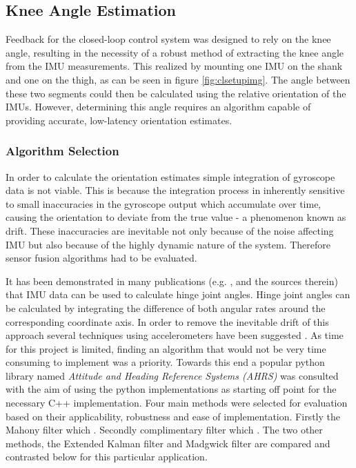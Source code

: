 \subsection{Knee Angle Estimation}
Feedback for the closed-loop control system was designed to rely on the knee angle, resulting in the necessity of a robust method of extracting the knee angle from the IMU measurements. This realized by mounting one IMU on the shank and one on the thigh, as can be seen in figure \ref{fig:clsetupimg}. The angle between these two segments could then be calculated using the relative orientation of the IMUs. However, determining this angle requires an algorithm capable of providing accurate, low-latency orientation estimates. 


\subsubsection{Algorithm Selection}
In order to calculate the orientation estimates simple integration of gyroscope data is not viable. This is because the integration process in inherently sensitive to small inaccuracies in the gyroscope output which accumulate over time, causing the orientation to deviate from the true value - a phenomenon known as drift. These inaccuracies are inevitable not only because of the noise affecting IMU but also because of the highly dynamic nature of the system. Therefore sensor fusion algorithms had to be evaluated.

It has been demonstrated in many publications (e.g. \cite{peng_cheng_joint-angle_2010}, \cite{sabatini_estimating_2011} and the sources therein) that IMU data can be used to calculate hinge joint angles. Hinge joint angles can be calculated by integrating the difference of both angular rates around the corresponding coordinate axis. In order to remove the inevitable drift of this approach several techniques using accelerometers have been suggested \cite{peng_cheng_joint-angle_2010}. As time for this project is limited, finding an algorithm that would not be very time consuming to implement was a priority. Towards this end a popular python library named \textit{Attitude and Heading Reference Systems (AHRS)} \cite{noauthor_ahrs_nodate} was consulted with the aim of using the python implementations as starting off point for the necessary C++ implementation. Four main methods were selected for evaluation based on their applicability, robustness and ease of implementation. Firstly the Mahony filter  which . Secondly complimentary filter  which . The two other methods, the Extended Kalman filter and Madgwick filter are compared and contrasted below for this particular application. 



